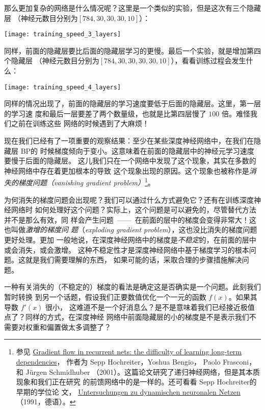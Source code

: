 那么更加复杂的网络是什么情况呢？这里是一个类似的实验，但是这次有三个隐藏层
（神经元数目分别为$[784, 30, 30, 30, 10]$）：
\begin{center}
  \texttt{[image: training\_speed\_3\_layers]}
\end{center}
 
同样，前面的隐藏层要比后面的隐藏层学习的更慢。最后一个实验，就是增加第四个隐藏层
（神经元数目分别为$[784, 30, 30, 30, 30, 10]$），看看训练过程会发生什么：
\begin{center}
  \texttt{[image: training\_speed\_4\_layers]}
\end{center}
 
同样的情况出现了，前面的隐藏层的学习速度要低于后面的隐藏层。这里，第一层的学习速
度和最后一层要差了两个数量级，也就是比第四层慢了 $100$ 倍。难怪我们之前在训练这些
网络的时候遇到了大麻烦！
 
现在我们已经有了一项重要的观察结果：至少在某些深度神经网络中，在我们在隐藏层 BP的
时候梯度倾向于变小。这意味着在前面的隐藏层中的神经元学习速度要慢于后面的隐藏层。
这儿我们只在一个网络中发现了这个现象，其实在多数的神经网络中存在着更加根本的导致
这个现象出现的原因。这个现象也被称作是\emph{消失的梯度问题（vanishing gradient
  problem）}\footnote{参见
  \href{http://citeseerx.ist.psu.edu/viewdoc/summary?doi=10.1.1.24.7321}{Gradient
    flow in recurrent nets: the difficulty of learning long-term dependencies}，
  作者为 Sepp Hochreiter，Yoshua Bengio， Paolo Frasconi， 和 Jürgen
  Schmidhuber （2001）。这篇论文研究了递归神经网络，但是其本质现象和我们正在研究
  的前馈网络中的是一样的。还可看看 Sepp Hochreiter的早期的学位论
  文，
  \href{http://www.idsia.ch/~juergen/SeppHochreiter1991ThesisAdvisorSchmidhuber.pdf}{Untersuchungen
    zu dynamischen neuronalen Netzen} （1991，德语）。}。
 
为何消失的梯度问题会出现呢？我们可以通过什么方式避免它？还有在训练深度神经网络时
如何处理好这个问题？实际上，这个问题是可以避免的，尽管替代方法并不是那么有效，同
样会产生问题~——~在前面的层中的梯度会变得非常大！这也叫做\emph{激增的梯度问
  题}（\emph{exploding gradient problem}），这也没比消失的梯度问题更好处理。更加
一般地说，在深度神经网络中的梯度是\emph{不稳定}的，在前面的层中或会消失，或会激增。
这种不稳定性才是深度神经网络中基于梯度学习的根本问题。这就是我们需要理解的东西，
如果可能的话，采取合理的步骤措施解决问题。
 
一种有关消失的（不稳定的）梯度的看法是确定这是否确实是一个问题。此刻我们暂时转换
到另一个话题，假设我们正要数值优化一个一元的函数 $f(x)$。如果其导数 $f'(x)$ 很小，
这难道不是一个好消息么？是不是意味着我们已经接近极值点了？同样的方式，在深度神经
网络中前面隐藏层的小的梯度是不是表示我们不需要对权重和偏置做太多调整了？
 
